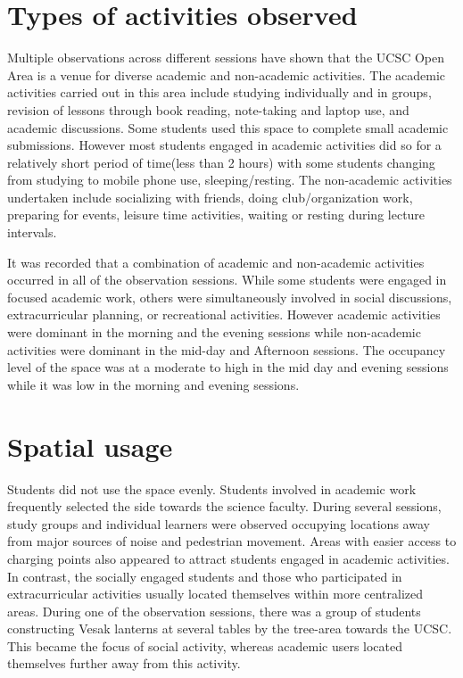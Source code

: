 \documentclass[12pt]{report}
\begin{document}
\section{Types of activities observed}
Multiple observations across different sessions have shown that the UCSC Open Area is a venue for diverse academic and non-academic activities. The academic activities carried out in this area include studying individually and in groups, 
revision of lessons through book reading, note-taking and laptop use, and academic discussions. Some students used this space to complete small academic submissions. However most students engaged in academic activities did so for a relatively 
short period of time(less than 2 hours) with some students changing from studying to mobile phone use, sleeping/resting. The non-academic activities undertaken include socializing with friends, doing club/organization work, preparing for events, 
leisure time activities, waiting or resting during lecture intervals.

It was recorded that a combination of academic and non-academic activities occurred in all of the observation sessions. While some students were engaged in focused academic work, others were simultaneously involved in social discussions, extracurricular 
planning, or recreational activities. However academic activities were dominant in the morning and the evening sessions while non-academic activities were dominant in the mid-day and Afternoon sessions. The occupancy level of the space was at a moderate 
to high in the mid day and evening sessions while it was low in the morning and evening sessions.

\vspace{0.9cm}

\section{Spatial usage}
Students did not use the space evenly. Students involved in academic work frequently selected the side towards the science faculty. During several sessions, study groups and individual learners were observed occupying locations away from major sources 
of noise and pedestrian movement. Areas with easier access to charging points also appeared to attract students engaged in academic activities. In contrast, the socially engaged students and those who participated in extracurricular activities usually
located themselves within more centralized areas. During one of the observation sessions, there was a group of students constructing Vesak lanterns at several tables by the tree-area towards the UCSC. This became the focus of social activity, whereas 
academic users located themselves further away from this activity.
\end{document}
